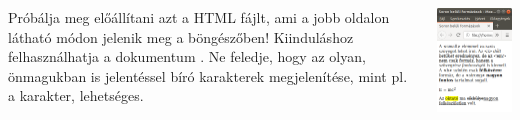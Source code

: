 \begin{frame}
  \begin{columns}[c]
      Próbálja meg előállítani azt a HTML fájlt, ami a jobb oldalon látható módon jelenik meg a böngészőben!
      Kiinduláshoz felhasználhatja a dokumentum .
      Ne feledje, hogy az olyan, önmagukban is jelentéssel bíró karakterek megjelenítése, mint pl. a \kiemel{<}
      karakter,  lehetséges.
      \begin{center}
        \begin{exampleblock}{}
          \centering \includegraphics[scale=.35]{soronbelul.png}
        \end{exampleblock}
      \end{center}
  \end{columns}
\end{frame}
